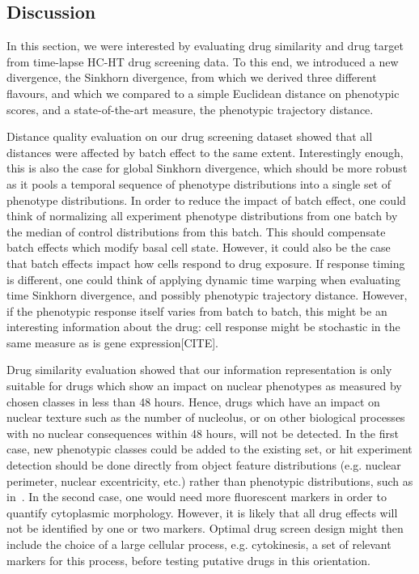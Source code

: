 
\subsection{Discussion}
In this section, we were interested by evaluating drug similarity and drug target from time-lapse HC-HT drug screening data. To this end, we introduced a new divergence, the Sinkhorn divergence, from which we derived three different flavours, and which we compared to a simple Euclidean distance on phenotypic scores, and a state-of-the-art measure, the phenotypic trajectory distance.

Distance quality evaluation on our drug screening dataset showed that all distances were affected by batch effect to the same extent. Interestingly enough, this is also the case for global Sinkhorn divergence, which should be more robust as it pools a temporal sequence of phenotype distributions into a single set of phenotype distributions. In order to reduce the impact of batch effect, one could think of normalizing all experiment phenotype distributions from one batch by the median of control distributions from this batch. This should compensate batch effects which modify basal cell state. However, it could also be the case that batch effects impact how cells respond to drug exposure. If response timing is different, one could think of applying dynamic time warping when evaluating time Sinkhorn divergence, and possibly phenotypic trajectory distance. However, if the phenotypic response itself varies from batch to batch, this might be an interesting information about the drug: cell response might be stochastic in the same measure as is gene expression[CITE].

Drug similarity evaluation showed that our information representation is only suitable for drugs which show an impact on nuclear phenotypes as measured by chosen classes in less than 48 hours. Hence, drugs which have an impact on nuclear texture such as the number of nucleolus, or on other biological processes with no nuclear consequences within 48 hours, will not be detected. In the first case, new phenotypic classes could be added to the existing set, or hit experiment detection should be done directly from object feature distributions (e.g. nuclear perimeter, nuclear excentricity, etc.) rather than phenotypic distributions, such as in~\cite{pmid18066055}. In the second case, one would need more fluorescent markers in order to quantify cytoplasmic morphology. However, it is likely that all drug effects will not be identified by one or two markers. Optimal drug screen design might then include the choice of a large cellular process, e.g. cytokinesis, a set of relevant markers for this process, before testing putative drugs in this orientation.

